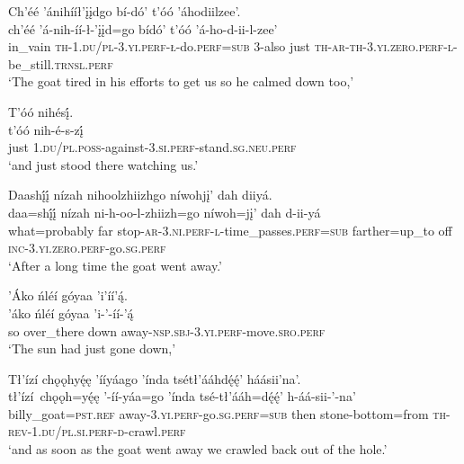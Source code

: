 \ea\label{ex:text6-8-24}
Ch’éé ’ánihííł’įįdgo bí-dó’ t’óó ’áhodiilzee’.\\
\gll ch’éé	’á-nih-íí-ł-’įįd=go	bídó’	t’óó	’á-ho-d-ii-l-zee’\\
     in\_vain	\textsc{th}-1.\textsc{du}/\textsc{pl}-3.\textsc{yi}.\textsc{perf}-\textsc{ł}-do.\textsc{perf}=\textsc{sub}	3-also	just	\textsc{th}-\textsc{ar}-\textsc{th}-3.\textsc{yi}.\textsc{zero}.\textsc{perf}-\textsc{l}-be\_still.\textsc{trnsl}.\textsc{perf}\\
\glt `The goat tired in his efforts to get us so he calmed down too,'
\z

\newpage
\ea\label{ex:text6-8-25}
T’óó nihésį́.\\
\gll t’óó	nih-é-s-zį́\\
     just	1.\textsc{du}/\textsc{pl}.\textsc{poss}-against-3.\textsc{si}.\textsc{perf}-stand.\textsc{sg}.\textsc{neu}.\textsc{perf}\\
\glt `and just stood there watching us.'
\z

\ea\label{ex:text6-9-1}
Daashį́į́ nízah nihoolzhiizhgo níwohjį’ dah diiyá.\\
\gll daa=shį́į́	nízah	ni-h-oo-l-zhiizh=go	níwoh=jį’	dah	d-ii-yá\\
     what=probably	far	stop-\textsc{ar}-3.\textsc{ni}.\textsc{perf}-\textsc{l}-time\_passes.\textsc{perf}=\textsc{sub}	farther=up\_to	off	\textsc{inc}-3.\textsc{yi}.\textsc{zero}.\textsc{perf}-go.\textsc{sg}.\textsc{perf}\\
\glt `After a long time the goat went away.'
\z

\ea\label{ex:text6-9-2}
’Áko ńléí góyaa ’i’íí’ą́.\\
\gll ’áko	ńléí	góyaa	’i-’-íí-’ą́\\
     so	over\_there	down	away-\textsc{nsp}.\textsc{sbj}-3.\textsc{yi}.\textsc{perf}-move.\textsc{sro}.\textsc{perf}\\
\glt `The sun had just gone down,'
\z

\ea\label{ex:text6-9-3}
Tł’ízí chǫǫhyę́ę ’ííyáago ’índa tsétł’ááhdę́ę́’ háásii’na’.\\
\gll tł’ízí~{chǫǫh=yę́ę}	’-íí-yáa=go	’índa	tsé-tł’ááh=dę́ę́’	h-áá-sii-’-na’\\
     billy\_goat=\textsc{pst}.\textsc{ref}	away-3.\textsc{yi}.\textsc{perf}-go.\textsc{sg}.\textsc{perf}=\textsc{sub}	then	stone-bottom=from	\textsc{th}-\textsc{rev}-1.\textsc{du}/\textsc{pl}.\textsc{si}.\textsc{perf}-\textsc{d}-crawl.\textsc{perf}\\
\glt `and as soon as the goat went away we crawled back out of the hole.'
\z

